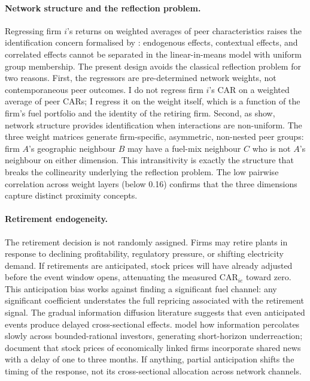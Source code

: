 \documentclass[12pt,a4paper]{article}
\begin{document}
\paragraph{Network structure and the reflection problem.}
Regressing firm $i$'s returns on weighted averages of peer characteristics raises the identification concern formalised by \citet{Manski1993}: endogenous effects, contextual effects, and correlated effects cannot be separated in the linear-in-means model with uniform group membership. The present design avoids the classical reflection problem for two reasons. First, the regressors are pre-determined network weights, not contemporaneous peer outcomes. I do not regress firm $i$'s CAR on a weighted average of peer CARs; I regress it on the weight itself, which is a function of the firm's fuel portfolio and the identity of the retiring firm. Second, as \citet{BramoulleDjebbariFortin2009} show, network structure provides identification when interactions are non-uniform. The three weight matrices generate firm-specific, asymmetric, non-nested peer groups: firm $A$'s geographic neighbour $B$ may have a fuel-mix neighbour $C$ who is not $A$'s neighbour on either dimension. This intransitivity is exactly the structure that breaks the collinearity underlying the reflection problem. The low pairwise correlation across weight layers (below 0.16) confirms that the three dimensions capture distinct proximity concepts.

\paragraph{Retirement endogeneity.}
The retirement decision is not randomly assigned. Firms may retire plants in response to declining profitability, regulatory pressure, or shifting electricity demand. If retirements are anticipated, stock prices will have already adjusted before the event window opens, attenuating the measured $\text{CAR}_{ie}$ toward zero. This anticipation bias works against finding a significant fuel channel: any significant coefficient understates the full repricing associated with the retirement signal. The gradual information diffusion literature suggests that even anticipated events produce delayed cross-sectional effects. \citet{HongStein1999} model how information percolates slowly across bounded-rational investors, generating short-horizon underreaction; \citet{CohenFrazzini2008} document that stock prices of economically linked firms incorporate shared news with a delay of one to three months. If anything, partial anticipation shifts the timing of the response, not its cross-sectional allocation across network channels.
\end{document}
